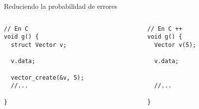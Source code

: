 \begin{frame}[fragile]{Reduciendo la probabilidad de errores}
   \begin{columns}[t]
      \begin{column}{.4\linewidth}
         \begin{lstlisting}[style=normal,firstnumber=29,linebackgroundcolor={%
                 \btLstHLB<1>{31}%
                 \btLstHLR<2>{33,35}%
                 \btLstHLR<3>{38}%
         }]
// En C
void g() {
  struct Vector v;
  
  v.data;
   
  vector_create(&v, 5);
  //...

}
         \end{lstlisting}
     \end{column}
      \begin{column}{.4\linewidth}
         \begin{lstlisting}[style=normal,firstnumber=29,linebackgroundcolor={%
                 \btLstHLB<1>{31}%
                 \btLstHLB<2>{31,33}%
                 \btLstHLB<3>{38}%
         }]
// En C ++
void g() {
  Vector v(5);
  
  v.data;
  

  //...
 
}
         \end{lstlisting}
     \end{column}
 \end{columns}
\end{frame}

